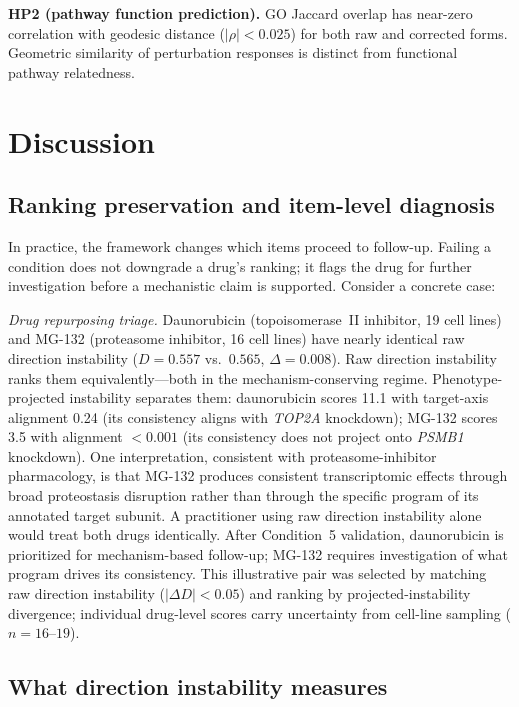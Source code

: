 \documentclass[11pt]{article}
\begin{document}
\textbf{HP2 (pathway function prediction).} GO Jaccard overlap has near-zero correlation with geodesic distance
($|\rho| < 0.025$) for both raw and corrected forms. Geometric similarity
of perturbation responses is distinct from functional pathway relatedness.

\section{Discussion}

\subsection{Ranking preservation and item-level diagnosis}

In practice, the framework changes which items proceed to follow-up.
Failing a condition does not downgrade a drug's ranking; it flags the drug
for further investigation before a mechanistic claim is supported.
Consider a concrete case:

\emph{Drug repurposing triage.} Daunorubicin (topoisomerase~II inhibitor,
19 cell lines) and MG-132 (proteasome inhibitor, 16 cell lines) have
nearly identical raw direction instability ($D = 0.557$ vs.\ $0.565$,
$\Delta = 0.008$). Raw direction instability ranks them equivalently---both in the
mechanism-conserving regime. Phenotype-projected instability separates them:
daunorubicin scores 11.1 with target-axis alignment 0.24 (its consistency
aligns with \emph{TOP2A} knockdown); MG-132 scores 3.5 with alignment
$< 0.001$ (its consistency does not project onto \emph{PSMB1} knockdown).
One interpretation, consistent with proteasome-inhibitor pharmacology, is
that MG-132 produces consistent transcriptomic effects through broad
proteostasis disruption rather than through the specific program of its
annotated target subunit. A practitioner using raw direction instability alone would
treat both drugs identically. After Condition~5 validation, daunorubicin is
prioritized for mechanism-based follow-up; MG-132 requires investigation
of what program drives its consistency. This illustrative pair was selected
by matching raw direction instability ($|\Delta D| < 0.05$) and ranking by projected-instability
divergence; individual drug-level scores carry uncertainty from cell-line
sampling ($n = 16$--$19$).

\subsection{What direction instability measures}
\end{document}
